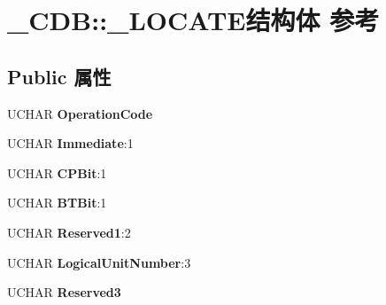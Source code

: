 \hypertarget{struct___c_d_b_1_1___l_o_c_a_t_e}{}\section{\+\_\+\+C\+DB\+:\+:\+\_\+\+L\+O\+C\+A\+T\+E结构体 参考}
\label{struct___c_d_b_1_1___l_o_c_a_t_e}
\subsection*{Public 属性}
\begin{DoxyCompactItemize}
\item 
\mbox{\label{struct___c_d_b_1_1___l_o_c_a_t_e_a42381354d4c655df117bdf2fca33fb6d}} 
U\+C\+H\+AR {\bfseries Operation\+Code}
\item 
\mbox{\label{struct___c_d_b_1_1___l_o_c_a_t_e_aad97e2251ec2bac80f3c6cc935a505bb}} 
U\+C\+H\+AR {\bfseries Immediate}\+:1
\item 
\mbox{\label{struct___c_d_b_1_1___l_o_c_a_t_e_ad11e32cfdecb0fc5a48f71c96b8d53fa}} 
U\+C\+H\+AR {\bfseries C\+P\+Bit}\+:1
\item 
\mbox{\label{struct___c_d_b_1_1___l_o_c_a_t_e_a29c6f7cf05c9c2e0356d839c8bc0dcdd}} 
U\+C\+H\+AR {\bfseries B\+T\+Bit}\+:1
\item 
\mbox{\label{struct___c_d_b_1_1___l_o_c_a_t_e_a8f563b4448a8c1bfd24955260ef308a1}} 
U\+C\+H\+AR {\bfseries Reserved1}\+:2
\item 
\mbox{\label{struct___c_d_b_1_1___l_o_c_a_t_e_a3059d13230b0a315cbeefb66d3cfaa9a}} 
U\+C\+H\+AR {\bfseries Logical\+Unit\+Number}\+:3
\item 
\mbox{\label{struct___c_d_b_1_1___l_o_c_a_t_e_a6e5e5e154a7d6dc6267f6bf1a07e2a99}} 
U\+C\+H\+AR {\bfseries Reserved3}
\item 
\mbox{\label{struct___c_d_b_1_1___l_o_c_a_t_e_a0ecb850809b0e833de065f7bc4de0566}} 

\end{DoxyCompactItemize}
